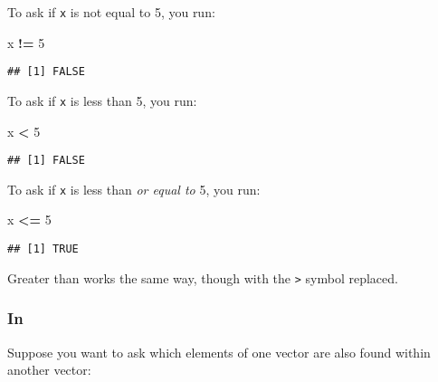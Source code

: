 \documentclass[]{book}
\newenvironment{Shaded}{\begin{snugshade}}{\end{snugshade}}
\newcommand{\KeywordTok}[1]{\textcolor[rgb]{0.13,0.29,0.53}{\textbf{#1}}}
\newcommand{\DecValTok}[1]{\textcolor[rgb]{0.00,0.00,0.81}{#1}}
\newcommand{\StringTok}[1]{\textcolor[rgb]{0.31,0.60,0.02}{#1}}
\newcommand{\OperatorTok}[1]{\textcolor[rgb]{0.81,0.36,0.00}{\textbf{#1}}}
\newcommand{\NormalTok}[1]{#1}
\theoremstyle{definition}
\theoremstyle{definition}
\theoremstyle{definition}
\theoremstyle{remark}
\begin{document}
To ask if \texttt{x} is not equal to 5, you run:

\begin{Shaded}
\begin{Highlighting}[]
\NormalTok{x }\OperatorTok{!=}\StringTok{ }\DecValTok{5}
\end{Highlighting}
\end{Shaded}

\begin{verbatim}
## [1] FALSE
\end{verbatim}

To ask if \texttt{x} is less than 5, you run:

\begin{Shaded}
\begin{Highlighting}[]
\NormalTok{x }\OperatorTok{<}\StringTok{ }\DecValTok{5}
\end{Highlighting}
\end{Shaded}

\begin{verbatim}
## [1] FALSE
\end{verbatim}

To ask if \texttt{x} is less than \emph{or equal to} 5, you run:

\begin{Shaded}
\begin{Highlighting}[]
\NormalTok{x }\OperatorTok{<=}\StringTok{ }\DecValTok{5}
\end{Highlighting}
\end{Shaded}

\begin{verbatim}
## [1] TRUE
\end{verbatim}

Greater than works the same way, though with the \texttt{\textgreater{}}
symbol replaced.

\subsubsection*{In}\label{in}

Suppose you want to ask which elements of one vector are also found
within another vector:

\begin{Shaded}
\end{Shaded}
\end{document}
